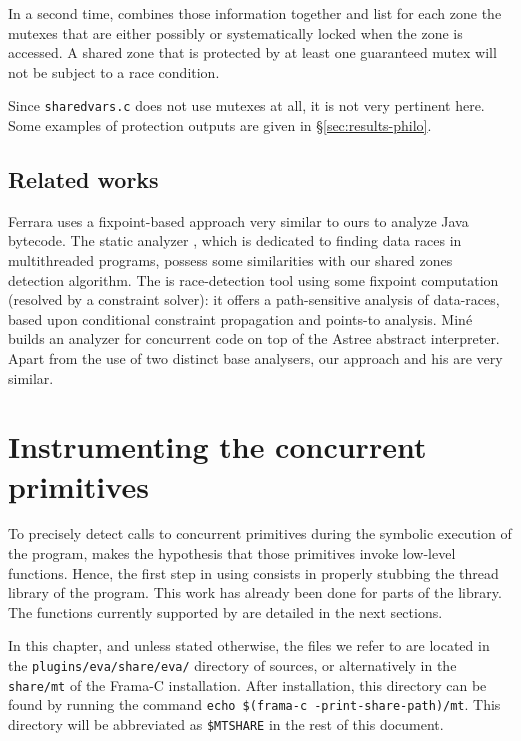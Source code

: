 \documentclass{frama-c-book}
\newcommand{\pthreads}{\library{pthreads}}
\begin{document}
In a second time, \mthread combines those information together and
list for each zone the mutexes that are either possibly or
systematically locked when the zone is accessed. A shared zone that is
protected by at least one guaranteed mutex will not be subject to a race
condition.

Since \verb+sharedvars.c+ does not use mutexes at all, it is not very
pertinent here. Some examples of protection outputs are given in
\S\ref{sec:results-philo}.


\endgroup

\section{Related works}

Ferrara \cite{Ferr09} uses a fixpoint-based approach very similar to
ours to analyze Java bytecode.
%
The static analyzer  \cite{hicks06lockinference}, which
is dedicated to finding data races in multithreaded \C programs, possess
some similarities with our shared zones detection
algorithm.
%
The  \cite{VVojVVen07} is race-detection tool using some
fixpoint computation (resolved by a constraint solver): it offers a
path-sensitive analysis of data-races, based upon conditional
constraint propagation and points-to analysis.
%
Miné~\cite{mine-LMCS12} builds an analyzer for concurrent code on
top of the Astree abstract interpreter. Apart from the use of two
distinct base analysers, our approach and his are very similar.


\chapter{Instrumenting the \C concurrent primitives}
\label{sec:instrumentation}

To precisely detect calls to concurrent primitives during the
symbolic execution of the program, \mthread makes the hypothesis
that those primitives invoke low-level \mthread functions. Hence,
the first step in using \mthread consists in properly stubbing
the thread library of the program. This work has already been done
for parts of the \pthreads library.
The functions currently supported by
\mthread are detailed in the next sections.

In this chapter, and unless stated otherwise, the files we refer to
are located in the \verb+plugins/eva/share/eva/+ directory of \FramaC
sources, or alternatively in the \verb+share/mt+ of the Frama-C installation.
After installation, this directory can be found by running the command
\verb+echo $(frama-c -print-share-path)/mt+. This directory will be
abbreviated as \verb+$MTSHARE+ in the rest of this document.
\end{document}
